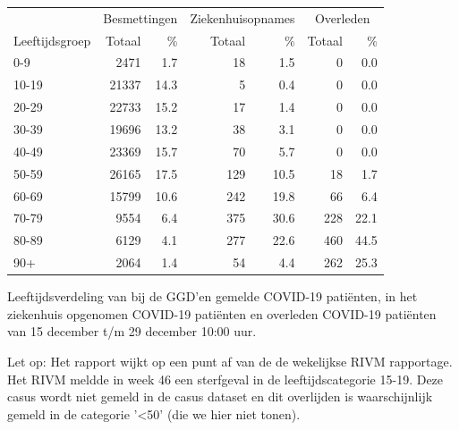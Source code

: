 \documentclass[
  english,
  man,floatsintext]{apa6}
\begin{document}
\begin{table}[H]
\centering\begingroup\fontsize{11}{13}\selectfont

\begin{threeparttable}
\begin{tabular}{lrrrrrr}
\toprule
\multicolumn{1}{c}{ } & \multicolumn{2}{c}{Besmettingen} & \multicolumn{2}{c}{Ziekenhuisopnames} & \multicolumn{2}{c}{Overleden} \\
\cmidrule(l{3pt}r{3pt}){2-3} \cmidrule(l{3pt}r{3pt}){4-5} \cmidrule(l{3pt}r{3pt}){6-7}
Leeftijdsgroep & Totaal & \% & Totaal & \% & Totaal & \%\\
\midrule
0-9 & 2471 & 1.7 & 18 & 1.5 & 0 & 0.0\\
10-19 & 21337 & 14.3 & 5 & 0.4 & 0 & 0.0\\
20-29 & 22733 & 15.2 & 17 & 1.4 & 0 & 0.0\\
30-39 & 19696 & 13.2 & 38 & 3.1 & 0 & 0.0\\
40-49 & 23369 & 15.7 & 70 & 5.7 & 0 & 0.0\\
50-59 & 26165 & 17.5 & 129 & 10.5 & 18 & 1.7\\
60-69 & 15799 & 10.6 & 242 & 19.8 & 66 & 6.4\\
70-79 & 9554 & 6.4 & 375 & 30.6 & 228 & 22.1\\
80-89 & 6129 & 4.1 & 277 & 22.6 & 460 & 44.5\\
90+ & 2064 & 1.4 & 54 & 4.4 & 262 & 25.3\\
\bottomrule
\end{tabular}
\begin{tablenotes}
\item[1] Leeftijdsverdeling van bij de GGD’en gemelde COVID-19 patiënten, in het ziekenhuis opgenomen COVID-19 patiënten en overleden COVID-19 patiënten van 15 december t/m 29 december 10:00 uur.
\item[2] Let op: Het rapport wijkt op een punt af van de de wekelijkse RIVM rapportage. Het RIVM meldde in week 46 een sterfgeval in de leeftijdscategorie 15-19. Deze casus wordt niet gemeld in de casus dataset en dit overlijden is waarschijnlijk gemeld in de categorie '<50' (die we hier niet tonen).
\end{tablenotes}
\end{threeparttable}
\endgroup{}
\end{table}

\newpage
\end{document}
